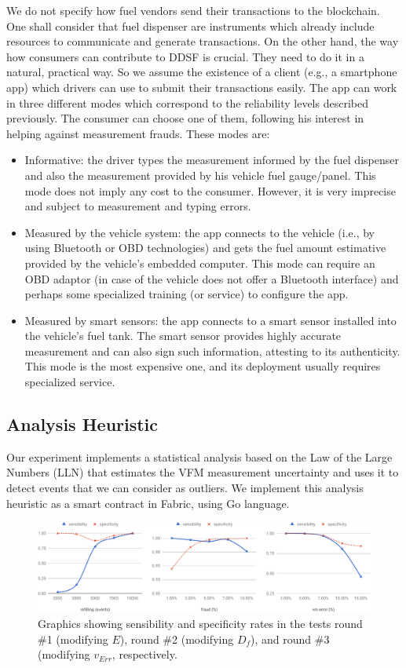 \documentclass[sigplan]{acmart}
\begin{document}
We do not specify how fuel vendors send their transactions to the blockchain.
One shall consider that fuel dispenser are instruments which already include resources to communicate and generate transactions.
On the other hand, the way how consumers can contribute to DDSF is crucial.
They need to do it in a natural, practical way.
So we assume the existence of a client (e.g., a smartphone app) which drivers can use to submit their transactions easily.
The app can work in three different modes which correspond to the reliability levels described previously.
The consumer can choose one of them, following his interest in helping against measurement frauds.
These modes are:
\begin{itemize}
 \item Informative: the driver types the measurement informed by the fuel dispenser and also the measurement provided by his vehicle fuel gauge/panel. This mode does not imply any cost to the consumer. However, it is very imprecise and subject to measurement and typing errors.
 \item Measured by the vehicle system: the app connects to the vehicle (i.e., by using Bluetooth or OBD technologies) and gets the fuel amount estimative provided by the vehicle's embedded computer. This mode can require an OBD adaptor (in case of the vehicle does not offer a Bluetooth interface) and perhaps some specialized training (or service) to configure the app.
 \item Measured by smart sensors: the app connects to a smart sensor installed into the vehicle's fuel tank. The smart sensor provides highly accurate measurement and can also sign such information, attesting to its authenticity. This mode is the most expensive one, and its deployment usually requires specialized service.
\end{itemize}

\subsection{Analysis Heuristic}
Our experiment implements a statistical analysis based on the Law of the Large Numbers (LLN) that estimates the VFM measurement uncertainty and uses it to detect events that we can consider as outliers.
We implement this analysis heuristic as a smart contract in Fabric, using Go language.

\begin{figure}[!t]
\centering
\includegraphics[width=.9\textwidth]{lln}
\caption{Graphics showing sensibility and specificity rates in the tests round \#1 (modifying $E$), round \#2 (modifying $D_f$), and round \#3 (modifying $v_{Err}$, respectively.}
\label{f:lln}
\end{figure}
\end{document}
